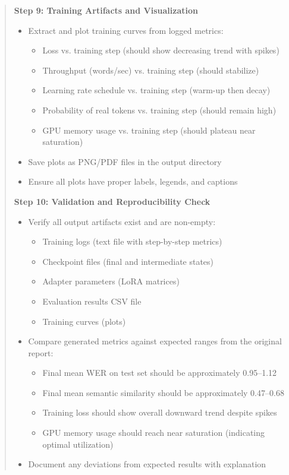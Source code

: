 \documentclass[12pt,a4paper]{article}
\begin{document}
\begin{quote}
{\textbf{Step 9: Training Artifacts and Visualization}
\begin{itemize}
    \item Extract and plot training curves from logged metrics:
    \begin{itemize}
        \item Loss vs. training step (should show decreasing trend with spikes)
        \item Throughput (words/sec) vs. training step (should stabilize)
        \item Learning rate schedule vs. training step (warm-up then decay)
        \item Probability of real tokens vs. training step (should remain high)
        \item GPU memory usage vs. training step (should plateau near saturation)
    \end{itemize}
    \item Save plots as PNG/PDF files in the output directory
    \item Ensure all plots have proper labels, legends, and captions
\end{itemize}

\textbf{Step 10: Validation and Reproducibility Check}
\begin{itemize}
    \item Verify all output artifacts exist and are non-empty:
    \begin{itemize}
        \item Training logs (text file with step-by-step metrics)
        \item Checkpoint files (final and intermediate states)
        \item Adapter parameters (LoRA matrices)
        \item Evaluation results CSV file
        \item Training curves (plots)
    \end{itemize}
    \item Compare generated metrics against expected ranges from the original report:
    \begin{itemize}
        \item Final mean WER on test set should be approximately 0.95--1.12
        \item Final mean semantic similarity should be approximately 0.47--0.68
        \item Training loss should show overall downward trend despite spikes
        \item GPU memory usage should reach near saturation (indicating optimal utilization)
    \end{itemize}
    \item Document any deviations from expected results with explanation
\end{itemize}

}
\end{quote}
\end{document}
